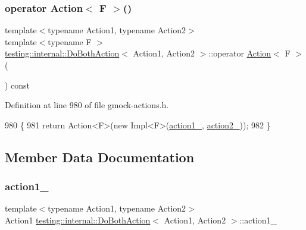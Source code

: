 \mbox{\label{classtesting_1_1internal_1_1DoBothAction_a35733e2f117daad110bfbd3de84634a6}} 
\subsubsection{\texorpdfstring{operator Action$<$ F $>$()}{operator Action< F >()}}
{\footnotesize\ttfamily template$<$typename Action1, typename Action2$>$ \\
template$<$typename F $>$ \\
\hyperlink{classtesting_1_1internal_1_1DoBothAction}{testing\+::internal\+::\+Do\+Both\+Action}$<$ Action1, Action2 $>$\+::operator \hyperlink{classtesting_1_1Action}{Action}$<$ F $>$ (\begin{DoxyParamCaption}{ }\end{DoxyParamCaption}) const\hspace{0.3cm}{\ttfamily [inline]}}



Definition at line 980 of file gmock-\/actions.\+h.


\begin{DoxyCode}
980                              \{
981     \textcolor{keywordflow}{return} Action<F>(\textcolor{keyword}{new} Impl<F>(\hyperlink{classtesting_1_1internal_1_1DoBothAction_af747366f4d0117d1058c6288bb152122}{action1\_}, \hyperlink{classtesting_1_1internal_1_1DoBothAction_a414a3fe2381da32b235524338bbb592e}{action2\_}));
982   \}
\end{DoxyCode}


\subsection{Member Data Documentation}
\mbox{\label{classtesting_1_1internal_1_1DoBothAction_af747366f4d0117d1058c6288bb152122}} 
\subsubsection{\texorpdfstring{action1\+\_\+}{action1\_}}
{\footnotesize\ttfamily template$<$typename Action1, typename Action2$>$ \\
Action1 \hyperlink{classtesting_1_1internal_1_1DoBothAction}{testing\+::internal\+::\+Do\+Both\+Action}$<$ Action1, Action2 $>$\+::action1\+\_\+\hspace{0.3cm}{\ttfamily [private]}}



